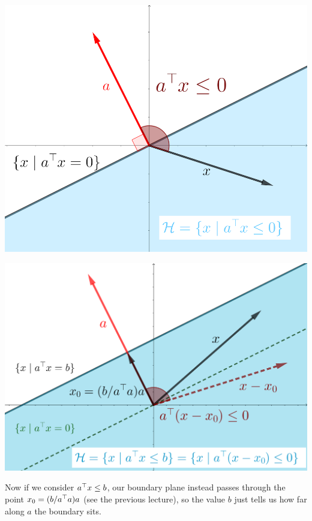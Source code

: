 \documentclass[11 pt]{scrartcl}
\begin{document}
\vspace{.4cm}
\begin{minipage}{.4\textwidth}
    \centering
    \includegraphics{hp0.png}
\end{minipage}%
\begin{minipage}{.6\textwidth}
    \centering
    \includegraphics[scale=0.75]{hpb.png}
\end{minipage}%
\vspace{.4cm}

Now if we consider $a^\top x \leq b$, our boundary plane instead passes through the point $x_0 = (b/a^\top a) a$ (see the previous lecture), so the value $b$ just tells us how far along $a$ the boundary sits. 
\end{document}
